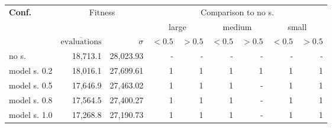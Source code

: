 \begin{tabular}{ l r r | rr | rr | rr }
\hline 
\textbf{Conf.} & \multicolumn{2}{c|}{Fitness} & \multicolumn{6}{c}{Comparison to no s.} \\ 
  &   &   & \multicolumn{2}{c}{large} & \multicolumn{2}{c}{medium} & \multicolumn{2}{c}{small} \\ 
  & $\overline{\text{evaluations}}$ & $\sigma$ & $<0.5$ & $>0.5$ & $<0.5$ & $>0.5$ & $<0.5$ & $>0.5$ \\ 
\hline 
no s. & 18,713.1 & 28,023.93 & - & - & - & - & - & - \\ 
model s. 0.2 & 18,016.1 & 27,699.61& 1& 1& 1& 1& 1& 1 \\ 
model s. 0.5 & 17,646.9 & 27,463.02& 1& 1& 1& -& 1& 1 \\ 
model s. 0.8 & 17,564.5 & 27,400.27& 1& 1& 1& -& 1& 1 \\ 
model s. 1.0 & 17,268.8 & 27,190.73& 1& 1& 1& -& 1& 1 \\ 
\hline 
\end{tabular}